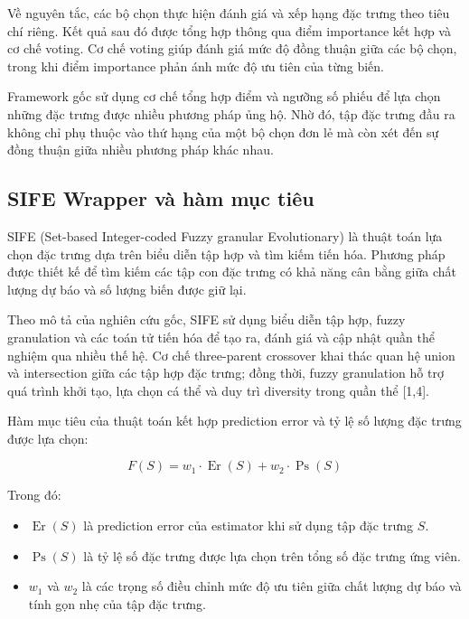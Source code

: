 Về nguyên tắc, các bộ chọn thực hiện đánh giá và xếp hạng đặc trưng
theo tiêu chí riêng. Kết quả sau đó được tổng hợp thông qua điểm
importance kết hợp và cơ chế voting. Cơ chế voting giúp đánh giá
mức độ đồng thuận giữa các bộ chọn, trong khi điểm importance
phản ánh mức độ ưu tiên của từng biến.

Framework gốc sử dụng cơ chế tổng hợp điểm và ngưỡng số phiếu
để lựa chọn những đặc trưng được nhiều phương pháp ủng hộ.
Nhờ đó, tập đặc trưng đầu ra không chỉ phụ thuộc vào thứ hạng
của một bộ chọn đơn lẻ mà còn xét đến sự đồng thuận giữa nhiều
phương pháp khác nhau.

\subsection{SIFE Wrapper và hàm mục tiêu}
\label{subsec:sife-theory}

SIFE (Set-based Integer-coded Fuzzy granular Evolutionary) là
thuật toán lựa chọn đặc trưng dựa trên biểu diễn tập hợp và tìm
kiếm tiến hóa. Phương pháp được thiết kế để tìm kiếm các tập con
đặc trưng có khả năng cân bằng giữa chất lượng dự báo và số lượng
biến được giữ lại.

Theo mô tả của nghiên cứu gốc, SIFE sử dụng biểu diễn tập hợp,
fuzzy granulation và các toán tử tiến hóa để tạo ra, đánh giá
và cập nhật quần thể nghiệm qua nhiều thế hệ. Cơ chế three-parent
crossover khai thác quan hệ union và intersection giữa các tập hợp
đặc trưng; đồng thời, fuzzy granulation hỗ trợ quá trình khởi tạo,
lựa chọn cá thể và duy trì diversity trong quần thể [1,4].

Hàm mục tiêu của thuật toán kết hợp prediction error và tỷ lệ
số lượng đặc trưng được lựa chọn:

\begin{equation}
    F(S)
    =
    w_1 \cdot \operatorname{Er}(S)
    +
    w_2 \cdot \operatorname{Ps}(S)
    \label{eq:sife-objective-original}
\end{equation}

Trong đó:

\begin{itemize}
    \item $\operatorname{Er}(S)$ là prediction error của estimator
    khi sử dụng tập đặc trưng $S$.
    \item $\operatorname{Ps}(S)$ là tỷ lệ số đặc trưng được lựa chọn
    trên tổng số đặc trưng ứng viên.
    \item $w_1$ và $w_2$ là các trọng số điều chỉnh mức độ ưu tiên
    giữa chất lượng dự báo và tính gọn nhẹ của tập đặc trưng.
\end{itemize}

